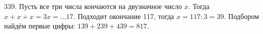339. Пусть все три числа кончаются на двузначное число $x.$ Тогда $x+x+x=3x=...17.$ Подходит окончание 117, тогда $x=117:3=39.$ Подбором найдём первые цифры: $139+239+439=817.$\\
